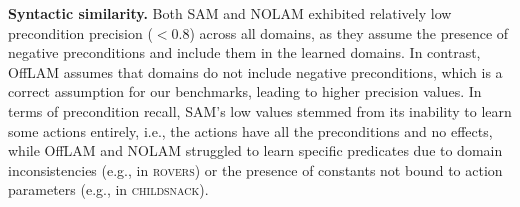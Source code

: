 \documentclass{article}
\newcommand{\miniparagraph}[1]{\textbf{#1.}}
\theoremstyle{definition}
\theoremstyle{remark}
\newcommand{\sam}{\ac{SAM}\xspace}
\newcommand{\nolam}{NOLAM\xspace}
\newcommand{\offlam}{OffLAM\xspace}
\newcommand{\samshort}{SAM}
\newif\ifaddcomments
\newcommand{\roni}[1]{\ifaddcomments{\textcolor{red}{[Roni: #1]}}\fi}
\newcommand{\argaman}[1]{\ifaddcomments{\textcolor{blue}{[Argaman: #1]}}\fi}
\newcommand{\leo}[1]{\ifaddcomments{\textcolor{pink}{[Leonardo: #1]}}\fi}
\begin{document}
\miniparagraph{Syntactic similarity} 
Both \samshort{} and \nolam{} exhibited relatively low precondition precision ($<0.8$) across all domains, as they assume the presence of negative preconditions and include them in the learned domains. 
In contrast, \offlam{} assumes that domains do not include negative preconditions, which is a correct assumption for our benchmarks, leading to higher precision values.
In terms of precondition recall, \samshort{}'s low values stemmed from its inability to learn some actions entirely, i.e., the actions have all the preconditions and no effects, while \offlam{} and \nolam{} struggled to learn specific predicates due to domain inconsistencies (e.g., in \textsc{rovers}) or the presence of constants not bound to action parameters (e.g., in \textsc{childsnack}).
\roni{All this discusses preconditions. What about the syntactic similarity of effects?}
\leo{For both \offlam{} and \nolam, the effects precision and recall always equals $1$ in all domains but rovers (because of inconsistent effects), goldminer (because of an unobserved negative effect) and childsnack (for an unobserved positive effect). \samshort{} achieved effects precision and recall as \offlam{} besides for domain \textsc{tpp}, where \sam{} achieved 50\% recall for both positive and negative effects.}
\end{document}
